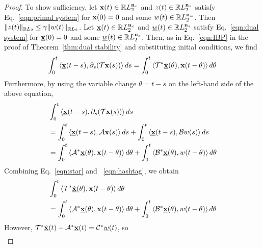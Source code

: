 \begin{proof}
    To show sufficiency, let $\mathbf{x}(t)\in\mathbb{R} L_2^{\mathbf{n}_x}$ and $z(t)\in \mathbb{R} L_2^{\mathbf{n}_z}$ satisfy Eq.~\ref{eqn:primal system} for $\mathbf{x}(0)=0$ and some $w(t)\in \mathbb{R} L_2^{\mathbf{n}_w}$. Then $\|z(t)\|_{\mathbb{R} L_2} \leq \gamma \|w(t)\|_{\mathbb{R} L_2}$. Let $\underline{\mathbf{x}}(t)\in \mathbb{R} L_2^{\mathbf{n}_x}$ and $\underline{w}(t)\in \mathbb{R} L_2^{\mathbf{n}_z}$ satisfy Eq.~\eqref{eqn:dual system} for $\underline{\mathbf{x}}(0) = 0$ and some $\underline{w}(t)\in \mathbb{R} L_2^{\mathbf{n}_z}$. Then, as in Eq.~\ref{eqn:IBP} in the proof of Theorem~\ref{thm:dual stability} and substituting initial conditions, we find
    \begin{equation}\label{eqn:star}
        \int_0^t\left\langle \underline{\mathbf{x}}(t-s), \partial_s(\mathcal{T}\mathbf{x}(s)) \right\rangle ds=\int_0^t\left\langle \mathcal{T}^*\dot{\underline{\mathbf{x}}}(\theta), \mathbf{x}(t-\theta) \right\rangle d\theta
    \end{equation}
    Furthermore, by using the variable change $\theta = t - s$ on the left-hand side of the above equation,
    \begin{equation}\label{eqn:hashtag}
        \begin{aligned}
            &\int_0^t\left\langle \underline{\mathbf{x}}(t-s), \partial_s(\mathcal{T}\mathbf{x}(s)) \right\rangle ds\\
            &= \int_0^t\left\langle \underline{\mathbf{x}}(t-s), \mathcal{A}\mathbf{x}(s) \right\rangle ds + \int_0^t\left\langle \underline{\mathbf{x}}(t-s), \mathcal{B}w(s) \right\rangle ds\\
            &=\int_0^t\left\langle \mathcal{A}^*\underline{\mathbf{x}}(\theta), \mathbf{x}(t-\theta) \right\rangle d\theta + \int_0^t\left\langle \mathcal{B}^*\underline{\mathbf{x}}(\theta), w(t-\theta) \right\rangle d\theta
        \end{aligned}
    \end{equation}
    Combining Eq.~\eqref{eqn:star} and ~\eqref{eqn:hashtag}, we obtain
    \begin{equation*}
        \begin{aligned}
            &\int_0^t\left\langle \mathcal{T}^*\dot{\underline{\mathbf{x}}}(\theta), \mathbf{x}(t-\theta) \right\rangle d\theta\\
            &=\int_0^t\left\langle \mathcal{A}^*\underline{\mathbf{x}}(\theta), \mathbf{x}(t-\theta) \right\rangle d\theta + \int_0^t \left\langle \mathcal{B}^*\underline{\mathbf{x}}(\theta), w(t-\theta) \right\rangle d\theta
        \end{aligned}
    \end{equation*}
    However, $\mathcal{T}^*\dot{\underline{\mathbf{x}}}(t) - \mathcal{A}^*\underline{\mathbf{x}}(t) = \mathcal{C}^*\underline{w}(t)$, so
    \begin{equation*}
        \begin{aligned}

\end{aligned}
\end{equation*}
\end{proof}
